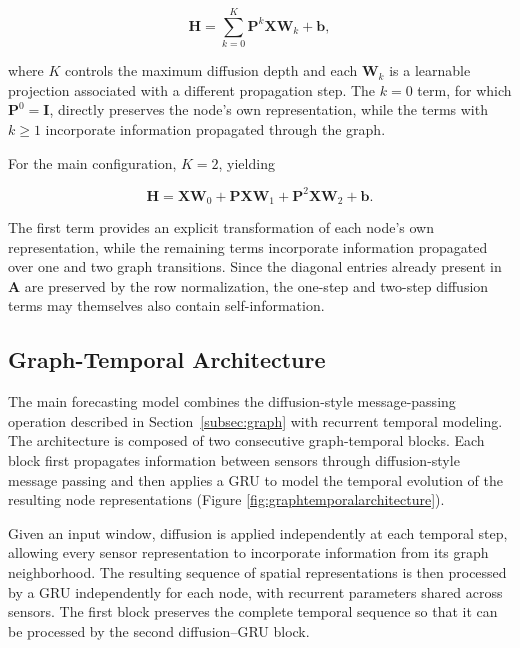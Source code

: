 \begin{equation}
    \mathbf{H}
    =
    \sum_{k=0}^{K}
    \mathbf{P}^{k}\mathbf{X}\mathbf{W}_{k}
    +
    \mathbf{b},
    \label{eq:diffusion}
\end{equation}

where $K$ controls the maximum diffusion depth and each $\mathbf{W}_{k}$ is
a learnable projection associated with a different propagation step. The
$k=0$ term, for which $\mathbf{P}^{0}=\mathbf{I}$, directly preserves the
node's own representation, while the terms with $k\geq1$ incorporate
information propagated through the graph.

For the main configuration, $K=2$, yielding

\begin{equation}
    \mathbf{H}
    =
    \mathbf{X}\mathbf{W}_{0}
    +
    \mathbf{P}\mathbf{X}\mathbf{W}_{1}
    +
    \mathbf{P}^{2}\mathbf{X}\mathbf{W}_{2}
    +
    \mathbf{b}.
    \label{eq:diffusion_k2}
\end{equation}

The first term provides an explicit transformation of each node's own
representation, while the remaining terms incorporate information propagated
over one and two graph transitions. Since the diagonal entries already
present in $\mathbf{A}$ are preserved by the row normalization, the
one-step and two-step diffusion terms may themselves also contain
self-information.


\subsection{Graph-Temporal Architecture}
\label{subsec:graph_temporal}

The main forecasting model combines the diffusion-style message-passing operation
described in
Section~\ref{subsec:graph} with recurrent temporal modeling. The architecture
is composed of two consecutive graph-temporal blocks. Each block first
propagates information between sensors through diffusion-style message passing and
then applies a GRU to model the temporal evolution of the resulting node
representations (Figure \ref{fig:graphtemporalarchitecture}).

Given an input window, diffusion is applied independently at each temporal
step, allowing every sensor representation to incorporate information from
its graph neighborhood. The resulting sequence of spatial representations is
then processed by a GRU independently for each node, with recurrent
parameters shared across sensors. The first block preserves the complete
temporal sequence so that it can be processed by the second diffusion--GRU
block.

